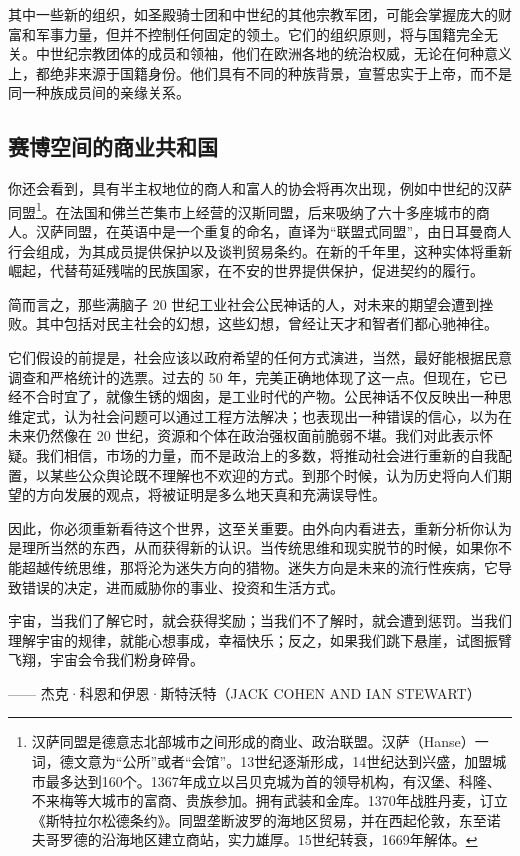 其中一些新的组织，如圣殿骑士团和中世纪的其他宗教军团，可能会掌握庞大的财富和军事力量，但并不控制任何固定的领土。它们的组织原则，将与国籍完全无关。中世纪宗教团体的成员和领袖，他们在欧洲各地的统治权威，无论在何种意义上，都绝非来源于国籍身份。他们具有不同的种族背景，宣誓忠实于上帝，而不是同一种族成员间的亲缘关系。


\subsection{赛博空间的商业共和国}
你还会看到，具有半主权地位的商人和富人的协会将再次出现，例如中世纪的汉萨同盟\footnote{汉萨同盟是德意志北部城市之间形成的商业、政治联盟。汉萨（Hanse）一词，德文意为“公所”或者“会馆”。13世纪逐渐形成，14世纪达到兴盛，加盟城市最多达到160个。1367年成立以吕贝克城为首的领导机构，有汉堡、科隆、不来梅等大城市的富商、贵族参加。拥有武装和金库。1370年战胜丹麦，订立《斯特拉尔松德条约》。同盟垄断波罗的海地区贸易，并在西起伦敦，东至诺夫哥罗德的沿海地区建立商站，实力雄厚。15世纪转衰，1669年解体。}。在法国和佛兰芒集市上经营的汉斯同盟，后来吸纳了六十多座城市的商人。汉萨同盟，在英语中是一个重复的命名，直译为“联盟式同盟”，由日耳曼商人行会组成，为其成员提供保护以及谈判贸易条约。在新的千年里，这种实体将重新崛起，代替苟延残喘的民族国家，在不安的世界提供保护，促进契约的履行。


简而言之，那些满脑子 20 世纪工业社会公民神话的人，对未来的期望会遭到挫败。其中包括对民主社会的幻想，这些幻想，曾经让天才和智者们都心驰神往。


它们假设的前提是，社会应该以政府希望的任何方式演进，当然，最好能根据民意调查和严格统计的选票。过去的 50 年，完美正确地体现了这一点。但现在，它已经不合时宜了，就像生锈的烟囱，是工业时代的产物。公民神话不仅反映出一种思维定式，认为社会问题可以通过工程方法解决；也表现出一种错误的信心，以为在未来仍然像在 20 世纪，资源和个体在政治强权面前脆弱不堪。我们对此表示怀疑。我们相信，市场的力量，而不是政治上的多数，将推动社会进行重新的自我配置，以某些公众舆论既不理解也不欢迎的方式。到那个时候，认为历史将向人们期望的方向发展的观点，将被证明是多么地天真和充满误导性。


因此，你必须重新看待这个世界，这至关重要。由外向内看进去，重新分析你认为是理所当然的东西，从而获得新的认识。当传统思维和现实脱节的时候，如果你不能超越传统思维，那将沦为迷失方向的猎物。迷失方向是未来的流行性疾病，它导致错误的决定，进而威胁你的事业、投资和生活方式。



\begin{tcolorbox}
宇宙，当我们了解它时，就会获得奖励；当我们不了解时，就会遭到惩罚。当我们理解宇宙的规律，就能心想事成，幸福快乐；反之，如果我们跳下悬崖，试图振臂飞翔，宇宙会令我们粉身碎骨。
\begin{flushright}
—— 杰克·科恩和伊恩·斯特沃特（JACK COHEN AND IAN STEWART）
\end{flushright}
\end{tcolorbox}

